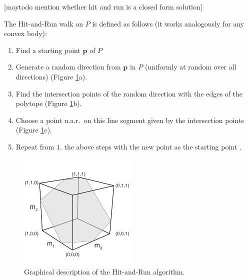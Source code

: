 [maytodo mention whether hit and run is a closed form solution]

The Hit-and-Run walk on $P$ is defined as follows (it works analogously for any convex body):
\begin{enumerate}
\item Find a starting point $\textbf{p}$ of $P$ %
\item Generate a random direction from $\textbf{p}$ in $P$ (uniformly at random over all directions) (Figure \ref{fig:hitruncube}a).
\item Find the intersection points of the random direction with the edges of the polytope (Figure \ref{fig:hitruncube}b).
\item Choose a point u.a.r.\ on this line segment given by the intersection points (Figure \ref{fig:hitruncube}c). 
\item Repeat from $1.$ the above steps with the new point as the starting point .
\end{enumerate}

\begin{figure}[htbp]
\centering
\includegraphics[width=0.5\textwidth,page=10]{sections/figs/HitandRunSchematics_all.pdf}
\caption{Graphical description of the Hit-and-Run algorithm.}
\label{fig:hitruncube}
\end{figure}

